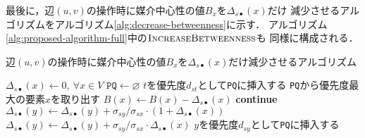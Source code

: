 最後に，辺$(u,v)$の操作時に媒介中心性の値$B_x$を$\Delta_{s\bullet}(x)$だけ
減少させるアルゴリズムをアルゴリズム\ref{alg:decrease-betweenness}に示す．
アルゴリズム\ref{alg:proposed-algorithm-full}中の$\textproc{IncreaseBetweenness}$も
同様に構成される．

\begin{algorithm}[tb]
  \caption{辺$(u,v)$の操作時に媒介中心性の値$B_x$を$\Delta_{s\bullet}(x)$だけ減少させるアルゴリズム}
  \label{alg:decrease-betweenness}
  \begin{algorithmic}[1]\small
    \State $\Delta_{s\bullet}(x)\gets0,\:\forall x\in V$
    \State $\texttt{PQ}\gets\varnothing$
    \State $t$を優先度$d_{st}$として\texttt{PQ}に挿入する
    \EndFor
    \State \texttt{PQ}から優先度最大の要素$x$を取り出す
    \State $B(x)\gets B(x)-\Delta_{s\bullet}(x)$
    \State \textbf{continue}
    \EndIf
    \State $\Delta_{s\bullet}(y)\gets\Delta_{s\bullet}(y)+\sigma_{sy}/\sigma_{sx}\cdot(1+\Delta_{s\bullet}(x))$
    \Else
    \State $\Delta_{s\bullet}(y)\gets\Delta_{s\bullet}(y)+\sigma_{sy}/\sigma_{sx}\cdot\Delta_{s\bullet}(x)$
    \EndIf
    \State $y$を優先度$d_{sy}$として\texttt{PQ}に挿入する
    \EndIf
    \EndFor
    \EndWhile
    \EndProcedure
  \end{algorithmic}
\end{algorithm}


